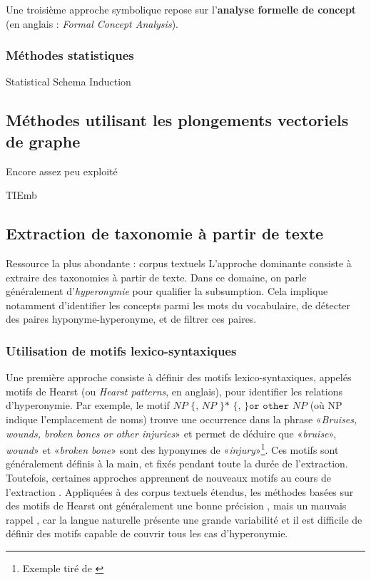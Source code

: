 Une troisième approche symbolique repose sur l'\textbf{analyse formelle de concept} (en anglais :  \textit{Formal Concept Analysis}).



\subsubsection{Méthodes statistiques}
Statistical Schema Induction


\subsection{Méthodes utilisant les plongements vectoriels de graphe}

Encore assez peu exploité

TIEmb

\subsection{Extraction de taxonomie à partir de texte}

Ressource la plus abondante : corpus textuels
L'approche dominante consiste à extraire des taxonomies à partir de texte. Dans ce domaine, on parle généralement d'\textit{hyperonymie} pour qualifier la subsumption. 
Cela implique notamment d'identifier les concepts parmi les mots du vocabulaire, de détecter des paires hyponyme-hyperonyme, et de filtrer ces paires.

\subsubsection{Utilisation de motifs lexico-syntaxiques}

Une première approche consiste à définir des motifs lexico-syntaxiques, appelés motifs de Hearst \cite{hearst1992automatic} (ou \textit{Hearst patterns}, en anglais), pour identifier les relations d'hyperonymie. Par exemple, le motif $NP \texttt{ \{, } NP \texttt{ \}* \{, \} or other } NP$ (où NP indique l'emplacement de noms) trouve une occurrence dans la phrase «\textit{Bruises, wounds, broken bones or other injuries}» et permet de déduire que «\textit{bruise}», \textit{wound}» et «\textit{broken bone}» sont des hyponymes de «\textit{injury}»\footnote{Exemple tiré de \cite{hearst1992automatic}}.
Ces motifs sont généralement définis à la main, et fixés pendant toute la durée de l'extraction. Toutefois, certaines approches apprennent de nouveaux motifs au cours de l'extraction \cite{snow2005learning, shwartz-etal-2016-improving}. Appliquées à des corpus textuels étendus, les méthodes basées sur des motifs de Hearst ont généralement une bonne précision \cite{roller-etal-2018-hearst}, mais un mauvais rappel \cite{wu2008automatically}, car la langue naturelle présente une grande variabilité et il est difficile de définir des motifs capable de couvrir tous les cas d'hyperonymie.

